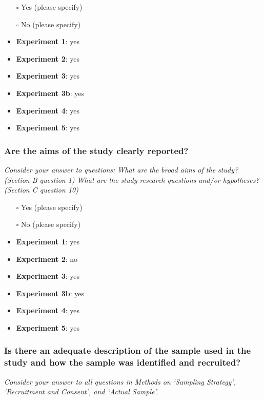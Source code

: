 \documentclass[
  doc, a4paper]{apa7}
\begin{document}
\begin{itemize}
\item[$\square$]
  Yes (please specify)
\item[$\square$]
  No (please specify)
\item
  \textbf{Experiment 1}: yes
\item
  \textbf{Experiment 2}: yes
\item
  \textbf{Experiment 3}: yes
\item
  \textbf{Experiment 3b}: yes
\item
  \textbf{Experiment 4}: yes
\item
  \textbf{Experiment 5}: yes
\end{itemize}

\subsubsection{Are the aims of the study clearly reported?}\label{are-the-aims-of-the-study-clearly-reported}

\emph{Consider your answer to questions: What are the broad aims of the study? (Section B question 1) What are the study research questions and/or hypotheses? (Section C question 10)}

\begin{itemize}
\item[$\square$]
  Yes (please specify)
\item[$\square$]
  No (please specify)
\item
  \textbf{Experiment 1}: yes
\item
  \textbf{Experiment 2}: no
\item
  \textbf{Experiment 3}: yes
\item
  \textbf{Experiment 3b}: yes
\item
  \textbf{Experiment 4}: yes
\item
  \textbf{Experiment 5}: yes
\end{itemize}

\subsubsection{Is there an adequate description of the sample used in the study and how the sample was identified and recruited?}\label{is-there-an-adequate-description-of-the-sample-used-in-the-study-and-how-the-sample-was-identified-and-recruited}

\emph{Consider your answer to all questions in Methods on `Sampling Strategy', `Recruitment and Consent', and `Actual Sample'.}
\end{document}
